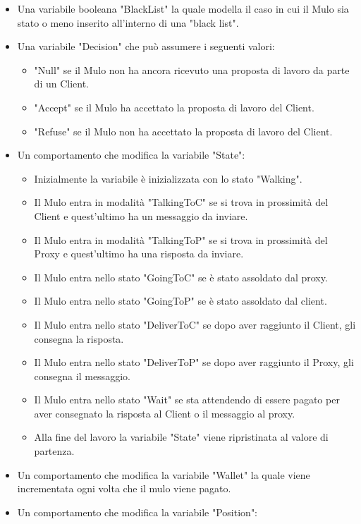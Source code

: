 \documentclass[13pt,a4paper]{article}
\begin{document}
\begin{itemize}
\begin{itemize}
\begin{itemize}
	\end{itemize}
	\item Una variabile booleana "BlackList" la quale modella il caso in cui il Mulo sia stato o meno inserito all'interno di una "black list".
 	\item Una variabile "Decision" che può assumere i seguenti valori:
 	\begin{itemize}
 		\item "Null" se il Mulo non ha ancora ricevuto una proposta di lavoro da parte di un Client.
 		\item "Accept" se il Mulo ha accettato la proposta di lavoro del Client.
 		\item "Refuse" se il Mulo non ha accettato la proposta di lavoro del Client.
 	\end{itemize}
		\item Un comportamento che modifica la variabile "State":
		\begin{itemize}
			\item Inizialmente la variabile è inizializzata con lo stato "Walking".
			\item Il Mulo entra in modalità "TalkingToC" se si trova in prossimità del Client e quest'ultimo ha un messaggio da inviare.
			\item Il Mulo entra in modalità "TalkingToP" se si trova in prossimità del Proxy e quest'ultimo ha una risposta da inviare.
			\item Il Mulo entra nello stato "GoingToC" se è stato assoldato dal proxy.
			\item Il Mulo entra nello stato "GoingToP" se è stato assoldato dal client.
			\item Il Mulo entra nello stato "DeliverToC" se dopo aver raggiunto il Client, gli consegna la risposta.
			\item Il Mulo entra nello stato "DeliverToP" se dopo aver raggiunto il Proxy, gli consegna il messaggio.
			\item Il Mulo entra nello stato "Wait" se sta attendendo di essere pagato per aver consegnato la risposta al Client o il messaggio al proxy.
			\item Alla fine del lavoro la variabile "State" viene ripristinata al valore di partenza.
		\end{itemize}
		\item Un comportamento che modifica la variabile "Wallet" la quale viene incrementata ogni volta che il mulo viene pagato.
		\item Un comportamento che modifica la variabile "Position":

\end{itemize}
\end{itemize}
\end{document}
